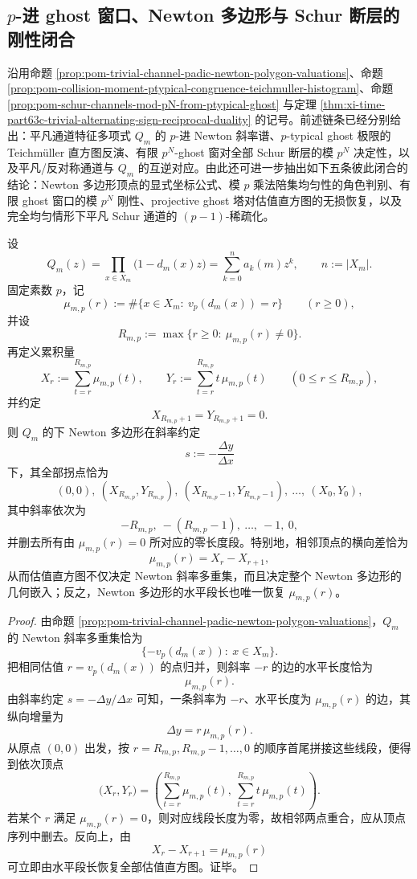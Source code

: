 \subsection{\texorpdfstring{$p$}{p}-进 ghost 窗口、Newton 多边形与 Schur 断层的刚性闭合}\label{subsec:conclusion-padic-ghost-newton-schur-rigidity}
沿用命题 \ref{prop:pom-trivial-channel-padic-newton-polygon-valuations}、命题 \ref{prop:pom-collision-moment-ptypical-congruence-teichmuller-histogram}、命题 \ref{prop:pom-schur-channels-mod-pN-from-ptypical-ghost} 与定理 \ref{thm:xi-time-part63c-trivial-alternating-sign-reciprocal-duality} 的记号。前述链条已经分别给出：平凡通道特征多项式 \(Q_m\) 的 \(p\)-进 Newton 斜率谱、\(p\)-typical ghost 极限的 Teichm\"uller 直方图反演、有限 \(p^N\)-ghost 窗对全部 Schur 断层的模 \(p^N\) 决定性，以及平凡/反对称通道与 \(Q_m\) 的互逆对应。由此还可进一步抽出如下五条彼此闭合的结论：Newton 多边形顶点的显式坐标公式、模 \(p\) 乘法陪集均匀性的角色判别、有限 ghost 窗口的模 \(p^N\) 刚性、projective ghost 塔对估值直方图的无损恢复，以及完全均匀情形下平凡 Schur 通道的 \((p-1)\)-稀疏化。

\begin{theorem}\label{thm:conclusion-padic-newton-polygon-vertices-valuation-histogram}
设
\[
Q_m(z)=\prod_{x\in X_m}\bigl(1-d_m(x)z\bigr)
=
\sum_{k=0}^{n}a_k(m)z^k,
\qquad
n:=|X_m|.
\]
固定素数 \(p\)，记
\[
\mu_{m,p}(r):=\#\{x\in X_m:\ v_p(d_m(x))=r\}
\qquad(r\ge 0),
\]
并设
\[
R_{m,p}:=\max\{r\ge 0:\ \mu_{m,p}(r)\neq 0\}.
\]
再定义累积量
\[
X_r:=\sum_{t=r}^{R_{m,p}}\mu_{m,p}(t),
\qquad
Y_r:=\sum_{t=r}^{R_{m,p}}t\,\mu_{m,p}(t)
\qquad(0\le r\le R_{m,p}),
\]
并约定
\[
X_{R_{m,p}+1}=Y_{R_{m,p}+1}=0.
\]
则 \(Q_m\) 的下 Newton 多边形在斜率约定
\[
s:=-\frac{\Delta y}{\Delta x}
\]
下，其全部拐点恰为
\[
\boxed{\;
(0,0),\ (X_{R_{m,p}},Y_{R_{m,p}}),\ (X_{R_{m,p}-1},Y_{R_{m,p}-1}),\ \dots,\ (X_0,Y_0),\;}
\]
其中斜率依次为
\[
-R_{m,p},\ -(R_{m,p}-1),\ \dots,\ -1,\ 0,
\]
并删去所有由 \(\mu_{m,p}(r)=0\) 所对应的零长度段。特别地，相邻顶点的横向差恰为
\[
\mu_{m,p}(r)=X_r-X_{r+1},
\]
从而估值直方图不仅决定 Newton 斜率多重集，而且决定整个 Newton 多边形的几何嵌入；反之，Newton 多边形的水平段长也唯一恢复 \(\mu_{m,p}(r)\)。
\end{theorem}
\begin{proof}
由命题 \ref{prop:pom-trivial-channel-padic-newton-polygon-valuations}，\(Q_m\) 的 Newton 斜率多重集恰为
\[
\{-v_p(d_m(x)):\ x\in X_m\}.
\]
把相同估值 \(r=v_p(d_m(x))\) 的点归并，则斜率 \(-r\) 的边的水平长度恰为
\[
\mu_{m,p}(r).
\]
由斜率约定 \(s=-\Delta y/\Delta x\) 可知，一条斜率为 \(-r\)、水平长度为 \(\mu_{m,p}(r)\) 的边，其纵向增量为
\[
\Delta y=r\,\mu_{m,p}(r).
\]
从原点 \((0,0)\) 出发，按 \(r=R_{m,p},R_{m,p}-1,\dots,0\) 的顺序首尾拼接这些线段，便得到依次顶点
\[
\bigl(X_r,Y_r\bigr)
=
\left(
\sum_{t=r}^{R_{m,p}}\mu_{m,p}(t),\
\sum_{t=r}^{R_{m,p}}t\,\mu_{m,p}(t)
\right).
\]
若某个 \(r\) 满足 \(\mu_{m,p}(r)=0\)，则对应线段长度为零，故相邻两点重合，应从顶点序列中删去。反向上，由
\[
X_r-X_{r+1}=\mu_{m,p}(r)
\]
可立即由水平段长恢复全部估值直方图。证毕。
\end{proof}

